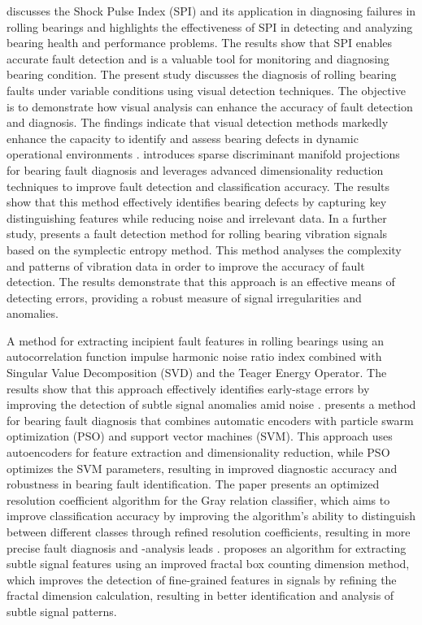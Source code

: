 \documentclass[sn-basic,pdflatex]{sn-jnl}
\theoremstyle{remark}
\theoremstyle{definition}
\begin{document}
\citet{WOS:000398818700108} discusses the Shock Pulse Index (SPI) and
its application in diagnosing failures in rolling bearings and
highlights the effectiveness of SPI in detecting and analyzing bearing
health and performance problems. The results show that SPI enables
accurate fault detection and is a valuable tool for monitoring and
diagnosing bearing condition. The present study discusses the diagnosis
of rolling bearing faults under variable conditions using visual
detection techniques. The objective is to demonstrate how visual
analysis can enhance the accuracy of fault detection and diagnosis. The
findings indicate that visual detection methods markedly enhance the
capacity to identify and assess bearing defects in dynamic operational
environments \citep{WOS:000404415000016}. \citet{WOS:000401109400020}
introduces sparse discriminant manifold projections for bearing fault
diagnosis and leverages advanced dimensionality reduction techniques to
improve fault detection and classification accuracy. The results show
that this method effectively identifies bearing defects by capturing key
distinguishing features while reducing noise and irrelevant data. In a
further study, \citet{WOS:000419006900041} presents a fault detection
method for rolling bearing vibration signals based on the symplectic
entropy method. This method analyses the complexity and patterns of
vibration data in order to improve the accuracy of fault detection. The
results demonstrate that this approach is an effective means of
detecting errors, providing a robust measure of signal irregularities
and anomalies.

A method for extracting incipient fault features in rolling bearings
using an autocorrelation function impulse harmonic noise ratio index
combined with Singular Value Decomposition (SVD) and the Teager Energy
Operator. The results show that this approach effectively identifies
early-stage errors by improving the detection of subtle signal anomalies
amid noise \citep{WOS:000416794600016}. \citet{WOS:000484465800028}
presents a method for bearing fault diagnosis that combines automatic
encoders with particle swarm optimization (PSO) and support vector
machines (SVM). This approach uses autoencoders for feature extraction
and dimensionality reduction, while PSO optimizes the SVM parameters,
resulting in improved diagnostic accuracy and robustness in bearing
fault identification. The paper presents an optimized resolution
coefficient algorithm for the Gray relation classifier, which aims to
improve classification accuracy by improving the algorithm's ability to
distinguish between different classes through refined resolution
coefficients, resulting in more precise fault diagnosis and -analysis
leads \citep{WOS:000477760600037}. \citet{WOS:000477760600061} proposes
an algorithm for extracting subtle signal features using an improved
fractal box counting dimension method, which improves the detection of
fine-grained features in signals by refining the fractal dimension
calculation, resulting in better identification and analysis of subtle
signal patterns.
\end{document}
